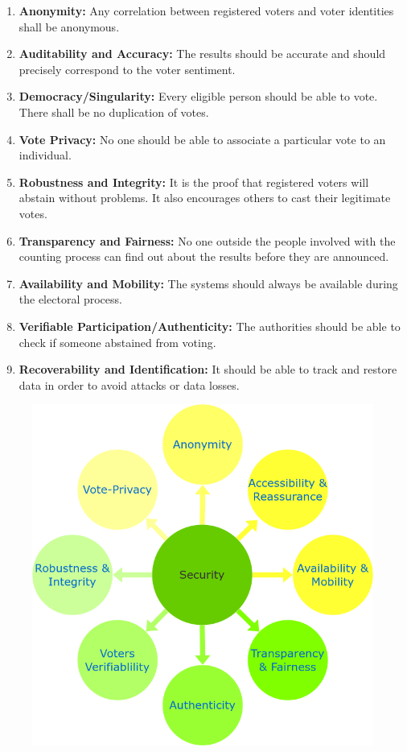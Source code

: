\documentclass[oneside, 12pt]{book}
\begin{document}
\begin{enumerate}
					\begin{enumerate}[i]
						\item\textbf{Anonymity:} Any correlation between registered voters and voter identities shall be anonymous.
						\item\textbf{Auditability and Accuracy:} The results should be accurate and should precisely correspond to the voter sentiment.
						\item\textbf{Democracy/Singularity:} Every eligible person should be able to vote. There shall be no duplication of votes.
						\item\textbf{Vote Privacy:} No one should be able to associate a particular vote to an individual.
						\item\textbf{Robustness and Integrity:} It is the proof that registered voters will abstain without problems. It also encourages others to cast their legitimate votes.
						\item\textbf{Transparency and Fairness:} No one outside the people involved with the counting process can find out about the results before they are announced.
						\item\textbf{Availability and Mobility:} The systems should always be available during the electoral process.
						\item\textbf{Verifiable Participation/Authenticity:} The authorities should be able to check if someone abstained from voting.
						\item\textbf{Recoverability and Identification:} It should be able to track and restore data in order to avoid attacks or data losses.
					\end{enumerate}
					\begin{figure}[H]
						\centering
						\includegraphics[width=0.6\linewidth]{./Resources/security-requirements.png}

\end{figure}
\end{enumerate}
\end{document}

